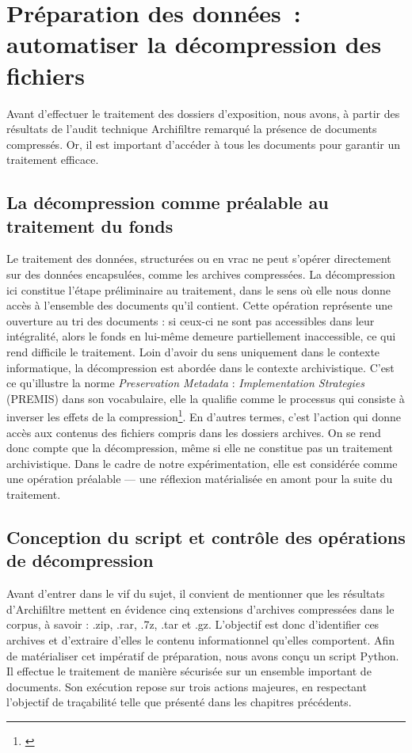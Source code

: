 \section{Préparation des données : automatiser la décompression des fichiers}

Avant d'effectuer le traitement des dossiers d'exposition, nous avons, à partir des résultats de l'audit technique Archifiltre remarqué la présence de documents compressés. Or, il est important d'accéder à tous les documents pour garantir un traitement efficace.

\subsection*{La décompression comme préalable au traitement du fonds}

Le traitement des données, structurées ou en vrac ne peut s'opérer directement sur des données encapsulées, comme les archives compressées. La décompression ici constitue l'étape préliminaire au traitement, dans le sens où elle nous donne accès à l'ensemble des documents qu'il contient. Cette opération représente une ouverture au tri des documents : si ceux-ci ne sont pas accessibles dans leur intégralité, alors le fonds en lui-même demeure partiellement inaccessible, ce qui rend difficile le traitement. Loin d'avoir du sens uniquement dans le contexte informatique, la décompression est abordée dans le contexte archivistique. C'est ce qu'illustre la norme \textit{Preservation Metadata} : \textit{Implementation Strategies} (PREMIS) dans son vocabulaire, elle la qualifie comme le processus qui consiste à inverser les effets de la compression\footnote{\cite{loc_premis_decompression}}. En d'autres termes, c'est l'action qui donne accès aux contenus des fichiers compris dans les dossiers archives. On se rend donc compte que la décompression, même si elle ne constitue pas un traitement archivistique. Dans le cadre de notre expérimentation, elle est considérée comme une opération préalable — une réflexion matérialisée en amont pour la suite du traitement.


\subsection*{Conception du script et contrôle des opérations de décompression}

Avant d'entrer dans le vif du sujet, il convient de mentionner que les résultats d'Archifiltre mettent en évidence cinq extensions d'archives compressées dans le corpus, à savoir : .zip, .rar, .7z, .tar et .gz. L'objectif est donc d'identifier ces archives et d'extraire d'elles le contenu informationnel qu'elles comportent. Afin de matérialiser cet impératif de préparation, nous avons conçu un script Python. Il effectue le traitement de manière sécurisée sur un ensemble important de documents.
Son exécution repose sur trois actions majeures, en respectant l'objectif de traçabilité telle que présenté dans les chapitres précédents.\\[0.2cm]

